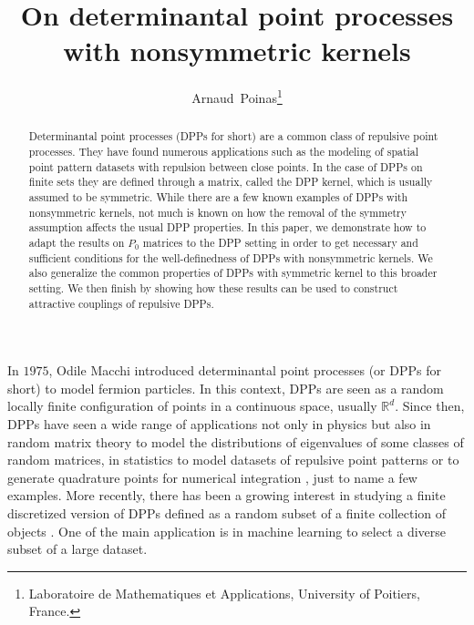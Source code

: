 \documentclass{article}
\title{On determinantal point processes with nonsymmetric kernels}
\author{%
  Arnaud~Poinas\footnote{Laboratoire de Mathematiques et Applications, University of Poitiers, France.}}
\numberwithin{equation}{section}
\newcommand{\bR}{\mathbb{R}}
\theoremstyle{plain}
\begin{document}
\maketitle

\begin{abstract}
Determinantal point processes (DPPs for short) are a common class of repulsive point processes. They have found numerous applications such as the modeling of spatial point pattern datasets with repulsion between close points. In the case of DPPs on finite sets they are defined through a matrix, called the DPP kernel, which is usually assumed to be symmetric. While there are a few known examples of DPPs with nonsymmetric kernels, not much is known on how the removal of the symmetry assumption affects the usual DPP properties. In this paper, we demonstrate how to adapt the results on $P_0$ matrices to the DPP setting in order to get necessary and sufficient conditions for the well-definedness of DPPs with nonsymmetric kernels. We also generalize the common properties of DPPs with symmetric kernel to this broader setting. We then finish by showing how these results can be used to construct attractive couplings of repulsive DPPs.
\end{abstract}

\bigskip

In $1975$, Odile Macchi \cite{Macchi} introduced determinantal point processes (or DPPs for short) to model fermion particles. In this context, DPPs are seen as a random locally finite configuration of points in a continuous space, usually $\bR^d$. Since then, DPPs have seen a wide range of applications not only in physics but also in random matrix theory \cite{Soshnikov} to model the distributions of eigenvalues of some classes of random matrices, in statistics \cite{Lavancier} to model datasets of repulsive point patterns or to generate quadrature points for numerical integration \cite{Bardenet20}, just to name a few examples. More recently, there has been a growing interest in studying a finite discretized version of DPPs defined as a random subset of a finite collection of objects \cite{Taskar, Lyons, ShiraiII}. One of the main application is in machine learning \cite{Taskar} to select a diverse subset of a large dataset. 

\medskip
\end{document}
